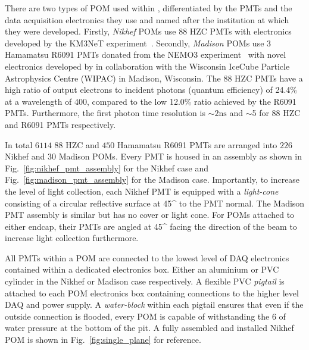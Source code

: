 There are two types of POM used within \chipsfive, differentiated by the PMTs and the data
acquisition electronics they use and named after the institution at which they were developed.
Firstly, \emph{Nikhef} POMs use \unit{88}{} HZC PMTs with electronics developed by the
KM3NeT experiment~\cite{katz2009, adrian2016}. Secondly, \emph{Madison} POMs use
\unit{3}{} Hamamatsu R6091 PMTs donated from the NEMO3 experiment~\cite{arnold2005}
with novel electronics developed by \chips in collaboration with the Wisconsin IceCube Particle
Astrophysics Centre (WIPAC) in Madison, Wisconsin. The \unit{88}{} HZC PMTs have a high
ratio of output electrons to incident photons (quantum efficiency) of 24.4\% at a wavelength of
\unit{400}{}, compared to the low 12.0\% ratio achieved by the R6091 PMTs. Furthermore,
the first photon time resolution is $\sim2\mathrm{ns}$ and $\sim$\unit{5}{} for
\unit{88}{} HZC and R6091 PMTs respectively.

In total $6114$ \unit{88}{} HZC and $450$ Hamamatsu R6091 PMTs are arranged into $226$
Nikhef and $30$ Madison POMs. Every PMT is housed in an assembly as shown in
Fig.~\ref{fig:nikhef_pmt_assembly} for the Nikhef case and Fig.~\ref{fig:madison_pmt_assembly} for
the Madison case. Importantly, to increase the level of light collection, each Nikhef PMT is
equipped with a \emph{light-cone} consisting of a circular reflective surface at \unit{45}{^\circ}
to the PMT normal. The Madison PMT assembly is similar but has no cover or light cone. For POMs
attached to either endcap, their PMTs are angled at \unit{45}{^\circ} facing the direction of the
beam to increase light collection furthermore.

All PMTs within a POM are connected to the lowest level of DAQ electronics contained within a
dedicated electronics box. Either an aluminium or PVC cylinder in the Nikhef or Madison case
respectively. A flexible PVC \emph{pigtail} is attached to each POM electronics box containing
connections to the higher level DAQ and power supply. A \emph{water-block} within each pigtail
ensures that even if the outside connection is flooded, every POM is capable of withstanding the
\unit{6}{} of water pressure at the bottom of the pit. A fully assembled and installed
Nikhef POM is shown in Fig.~\ref{fig:single_plane} for reference.

